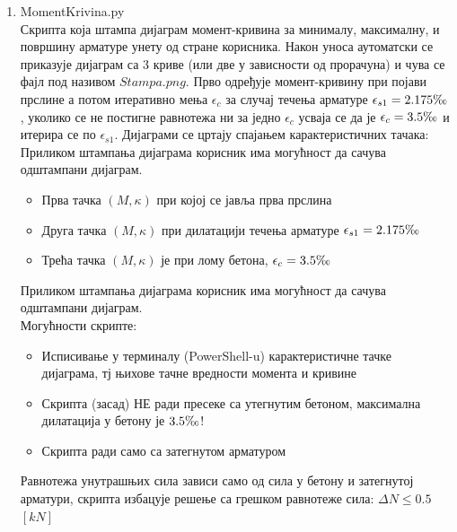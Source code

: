\documentclass[11pt, a4paper]{article}
\begin{document}
\begin{enumerate}
\item {\Large {MomentKrivina.py}}\\[5mm]
Скрипта која штампа дијаграм момент-кривина за минималу, максималну, и површину арматуре унету од стране корисника. Након уноса аутоматски се приказује дијаграм са 3 криве (или две у зависности од прорачуна) и чува се фајл под називом $Stampa.png$. Прво одређује момент-кривину при појави прслине а потом итеративно мења $\epsilon_c$  за случај течења арматуре $\epsilon_{s1} = 2.175 \perthousand$, уколико се не постигне равнотежа ни за једно $\epsilon_c$ усваја се да је $\epsilon_c = 3.5 \perthousand$ и итерира се по $\epsilon_{s1}$. Дијаграми се цртају спајањем карактеристичних тачака: Приликом штампања дијаграма корисник има могућност да сачува одштампани дијаграм.\\
\begin{itemize}

	\item Прва тачка $(M, \kappa)$ при којој се јавља прва прслина
	
	\item Друга тачка $(M, \kappa)$ при дилатацији течења арматуре $\epsilon_{s1} = 2.175 \perthousand$
	
	\item Трећа тачка $(M, \kappa)$ је при лому бетона, $\epsilon_c = 3.5 \perthousand$
\end{itemize}
 Приликом штампања дијаграма корисник има могућност да сачува одштампани дијаграм.\\
Могућности скрипте:
\begin{itemize}
	\item Исписивање у терминалу (PowerShell-u) карактеристичне тачке дијаграма, тј њихове тачне вредности момента и кривине
	
	\item Скрипта (засад) НЕ ради пресеке са утегнутим бетоном, максимална дилатација у бетону је $3.5 \perthousand$!
	
	\item Скрипта ради само са затегнутом арматуром
\end{itemize}
Равнотежа унутрашњих сила зависи само од сила у бетону и затегнутој арматури, скрипта избацује решење са грешком равнотеже сила: $\Delta N \leq 0.5$ $[kN]$



\end{enumerate}
\end{document}
